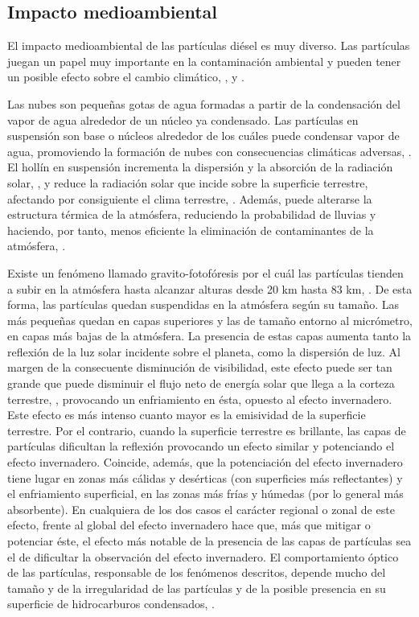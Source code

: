 \subsection{Impacto medioambiental}

\par El impacto medioambiental de las partículas diésel es muy diverso. Las partículas juegan un papel muy importante en la contaminación ambiental y pueden tener un posible efecto sobre el cambio climático, \cite{przybiolla:2002}, \cite{petterssonetal:2004} y \cite{chameidesetal:2002}.

\par Las nubes son pequeñas gotas de agua formadas a partir de la condensación del vapor de agua alrededor de un núcleo ya condensado. Las partículas en suspensión son base o núcleos alrededor de los cuáles puede condensar vapor de agua, promoviendo la formación de nubes con consecuencias climáticas adversas, \cite{zhangetal:2006}. El hollín en suspensión incrementa la dispersión y la absorción de la radiación solar, \cite{ackermanetal:2000}, y reduce la radiación solar que incide sobre la superficie terrestre, afectando por consiguiente el clima terrestre, \cite{menonetal:2002}. Además, puede alterarse la estructura térmica de la atmósfera, reduciendo la probabilidad de lluvias y haciendo, por tanto, menos eficiente la eliminación de contaminantes de la atmósfera, \cite{ramanathanetal:2001}.

\par Existe un fenómeno llamado gravito-fotofóresis por el cuál las partículas tienden a subir en la atmósfera hasta alcanzar alturas desde 20 km hasta 83 km, \cite{cheremisinetal:2005}. De esta forma, las partículas quedan suspendidas en la atmósfera según su tamaño. Las más pequeñas quedan en capas superiores y las de tamaño entorno al micrómetro, en capas más bajas de la atmósfera. La presencia de estas capas aumenta tanto la reflexión de la luz solar incidente sobre el planeta, como la dispersión de luz. Al margen de la consecuente disminución de visibilidad, este efecto puede ser tan grande que puede disminuir el flujo neto de energía solar que llega a la corteza terrestre, \cite{faxvogetal:1978}, provocando un enfriamiento en ésta, opuesto al efecto invernadero. Este efecto es más intenso cuanto mayor es la emisividad de la superficie terrestre. Por el contrario, cuando la superficie terrestre es brillante, las capas de partículas dificultan la reflexión provocando un efecto similar y potenciando el efecto invernadero. Coincide, además, que la potenciación del efecto invernadero tiene lugar en zonas más cálidas y desérticas (con superficies más reflectantes) y el enfriamiento superficial, en las zonas más frías y húmedas (por lo general más absorbente). En cualquiera de los dos casos el carácter regional o zonal de este efecto, frente al global del efecto invernadero hace que, más que mitigar o potenciar éste, el efecto más notable de la presencia de las capas de partículas sea el de dificultar la observación del efecto invernadero. El comportamiento óptico de las partículas, responsable de los fenómenos descritos, depende mucho del tamaño y de la irregularidad de las partículas y de la posible presencia en su superficie de hidrocarburos condensados, \cite{siegmannetal:1999}.

